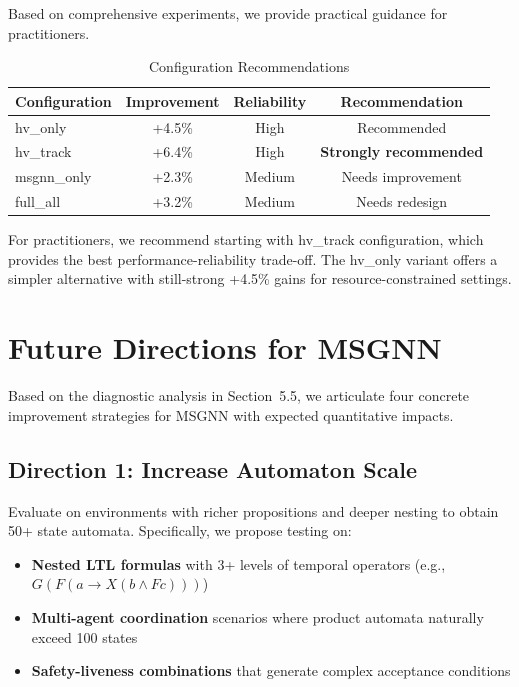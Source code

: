 \documentclass{article}
\begin{document}
Based on comprehensive experiments, we provide practical guidance for practitioners.

\begin{table}[h]
\centering
\caption{Configuration Recommendations}
\begin{tabular}{@{}lccc@{}}
\toprule
\textbf{Configuration} & \textbf{Improvement} & \textbf{Reliability} & \textbf{Recommendation} \\ \midrule
hv\_only & +4.5\% & High & Recommended \\
hv\_track & +6.4\% & High & \textbf{Strongly recommended} \\
msgnn\_only & +2.3\% & Medium & Needs improvement \\
full\_all & +3.2\% & Medium & Needs redesign \\ \bottomrule
\end{tabular}
\end{table}

For practitioners, we recommend starting with hv\_track configuration, which provides the best performance-reliability trade-off. The hv\_only variant offers a simpler alternative with still-strong +4.5\% gains for resource-constrained settings.


\section{Future Directions for MSGNN}
\label{app:future_directions}

Based on the diagnostic analysis in Section~5.5, we articulate four concrete improvement strategies for MSGNN with expected quantitative impacts.

\subsection{Direction 1: Increase Automaton Scale}

Evaluate on environments with richer propositions and deeper nesting to obtain 50+ state automata. Specifically, we propose testing on:
\begin{itemize}
\item \textbf{Nested LTL formulas} with 3+ levels of temporal operators (e.g., $G(F(a \rightarrow X(b \land F c)))$)
\item \textbf{Multi-agent coordination} scenarios where product automata naturally exceed 100 states
\item \textbf{Safety-liveness combinations} that generate complex acceptance conditions
\end{itemize}
\end{document}
